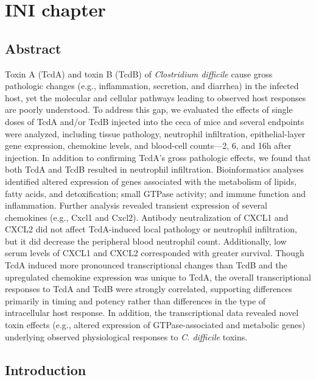 \doublespacing

\chapter{ INI chapter }

\section{Abstract}

Toxin A (TcdA) and toxin B (TcdB) of \textit{Clostridium difficile} cause gross pathologic changes (e.g., inflammation, secretion, and diarrhea) in the infected host, yet the molecular and cellular pathways leading to observed host responses are poorly understood. To address this gap, we evaluated the effects of single doses of TcdA and/or TcdB injected into the ceca of mice and several endpoints were analyzed, including tissue pathology, neutrophil infiltration, epithelial-layer gene expression, chemokine levels, and blood-cell counts—2, 6, and 16h after injection. In addition to confirming TcdA’s gross pathologic effects, we found that both TcdA and TcdB resulted in neutrophil infiltration. Bioinformatics analyses identified altered expression of genes associated with the metabolism of lipids, fatty acids, and detoxification; small GTPase activity; and immune function and inflammation. Further analysis revealed transient expression of several chemokines (e.g., Cxcl1 and Cxcl2). Antibody neutralization of CXCL1 and CXCL2 did not affect TcdA-induced local pathology or neutrophil infiltration, but it did decrease the peripheral blood neutrophil count. Additionally, low serum levels of CXCL1 and CXCL2 corresponded with greater survival. Though TcdA induced more pronounced transcriptional changes than TcdB and the upregulated chemokine expression was unique to TcdA, the overall transcriptional responses to TcdA and TcdB were strongly correlated, supporting differences primarily in timing and potency rather than differences in the type of intracellular host response. In addition, the transcriptional data revealed novel toxin effects (e.g., altered expression of GTPase-associated and metabolic genes) underlying observed physiological responses to \textit{C. difficile} toxins.

\section{Introduction}

